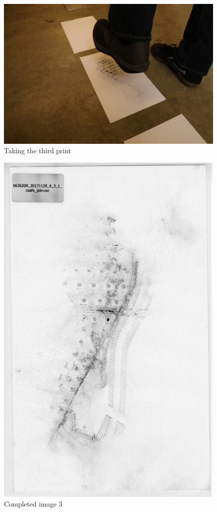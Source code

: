 \begin{figure}[!htp]
\centering
\includegraphics[scale=0.4]{Stomp}
\caption{Taking the third print}
\label{Image 7}
\end{figure}

\begin{figure}[!htp]
\centering
\includegraphics[scale=0.3]{Baseline_Paper_3}
\caption{Completed image 3}
\label{Image 8}
\end{figure}

